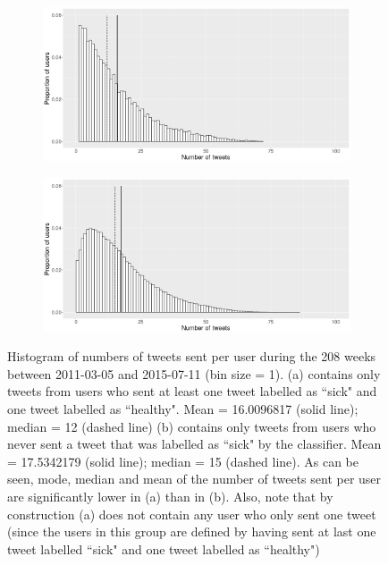 \documentclass[11pt, a4paper,twoside]{report}\usepackage[]{graphicx}\usepackage[]{color}
\begin{document}
\begin{figure}[H]
\centering
  \begin{subfigure}[b]{1\textwidth}
  \includegraphics[width=1\linewidth]{user_activity_both_sick_raw_df.png}
  \caption{}
  \end{subfigure}
  \begin{subfigure}[b]{1\textwidth}
  \includegraphics[width=1\linewidth]{user_activity_only_healthy_sick_raw_df.png}
  \caption{}
  \end{subfigure}
  \caption{Histogram of numbers of tweets sent per user during the 208 weeks between 2011-03-05 and 2015-07-11 (bin size = 1). (a) contains only tweets from users who sent at least one tweet labelled as ``sick" and one tweet labelled as ``healthy".  Mean = 16.0096817 (solid line); median = 12 (dashed line) (b) contains only tweets from users who never sent a tweet that was labelled as ``sick" by the classifier.  Mean = 17.5342179 (solid line); median = 15 (dashed line). As can be seen, mode, median and mean of the number of tweets sent per user are significantly lower in (a) than in (b). Also, note that by construction (a) does not contain any user who only sent one tweet (since the users in this group are defined by having sent at last one tweet labelled ``sick" and one tweet labelled as ``healthy")}
  \label{fig:both_vs_healthy_only_hist}

\end{figure}
\end{document}
